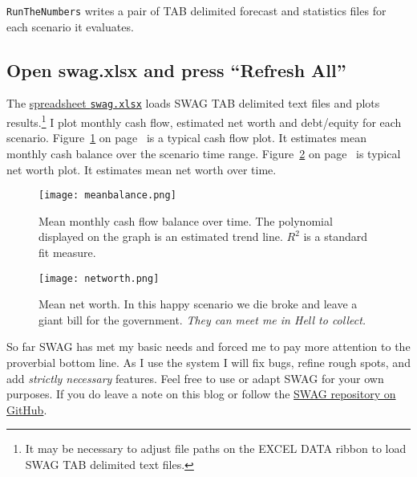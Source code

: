 \noindent \texttt{RunTheNumbers} writes a pair of TAB delimited forecast and
statistics files for each scenario it evaluates.

\subsection*{Open swag.xlsx and press ``Refresh All''}

The \href{https://github.com/bakerjd99/jacks/blob/master/swag/swag.xlsx}{spreadsheet \texttt{swag.xlsx}} 
loads SWAG TAB delimited text files
and plots results.\footnote{It may be necessary to adjust file paths on
  the EXCEL DATA ribbon to load SWAG TAB delimited text files.} I plot
monthly cash flow, estimated net worth and debt/equity for each
scenario. Figure~\ref{fig:5175x1} on page~\pageref{fig:5175x1} is a typical cash flow plot. It estimates mean
monthly cash balance over the scenario time range. Figure~\ref{fig:5175x2} on page~\pageref{fig:5175x2} is typical net worth plot.
It estimates mean net worth over time.


\captionsetup[figure]{labelformat=default}
\begin{figure}[htbp]
\centering
\texttt{[image: meanbalance.png]}
\caption{Mean monthly cash flow balance over time. The polynomial displayed on
the graph is an estimated trend line. $R^2$ is a standard fit measure.}
\label{fig:5175x1}
\end{figure}


\begin{figure}[htbp]
\centering
\texttt{[image: networth.png]}
\caption{Mean net worth. In this happy scenario we die broke and leave a giant bill for
the government. \textit{They can meet me in Hell to collect.}}
\label{fig:5175x2}
\end{figure}


So far SWAG has met my basic needs and forced me to pay more
attention to the proverbial bottom line. As I use the system I will fix
bugs, refine rough spots, and add \emph{strictly necessary} features.
Feel free to use or adapt SWAG for your own purposes. If you do leave a
note on this blog or follow the \href{https://github.com/bakerjd99/jacks/tree/master/swag}{SWAG repository on GitHub}.

%
